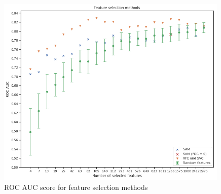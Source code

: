 \documentclass[shortabstract, english, mgr]{iithesis}
\begin{document}
\begin{figure}
\centering
\includegraphics[width=0.99\textwidth]{images/selection-scores.png}
\caption{ROC AUC score for feature selection methods}
\label{fig:selection-scores}
\end{figure}
\end{document}
